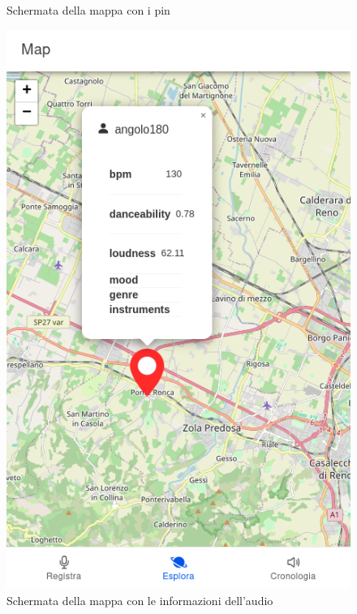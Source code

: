 \documentclass{article}
\begin{document}
\begin{figure}[H]
\begin{minipage}{0.30\textwidth}
        \centering
        \caption{Schermata della mappa con i pin}
        \label{fig:map-pins}
    \end{minipage} \hfill
    \begin{minipage}{0.30\textwidth}
        \includegraphics[width=\linewidth]{map-audio-info.png}
        \centering
        \caption{Schermata della mappa con le informazioni dell'audio}
        \label{fig:map-audio-info}
    \end{minipage} \hfill
    \begin{minipage}{0.30\textwidth}

\end{minipage}
\end{figure}
\end{document}
